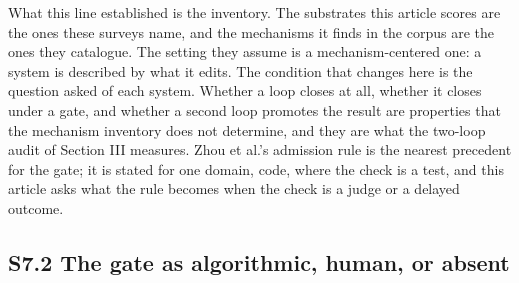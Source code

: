 \documentclass[
]{article}
\begin{document}
What this line established is the inventory. The substrates this article
scores are the ones these surveys name, and the mechanisms it finds in
the corpus are the ones they catalogue. The setting they assume is a
mechanism-centered one: a system is described by what it edits. The
condition that changes here is the question asked of each system.
Whether a loop closes at all, whether it closes under a gate, and
whether a second loop promotes the result are properties that the
mechanism inventory does not determine, and they are what the two-loop
audit of Section III measures. Zhou et al.'s admission rule is the
nearest precedent for the gate; it is stated for one domain, code, where
the check is a test, and this article asks what the rule becomes when
the check is a judge or a delayed outcome.

\subsection{S7.2 The gate as algorithmic, human, or
absent}\label{s7.2-the-gate-as-algorithmic-human-or-absent}
\end{document}
